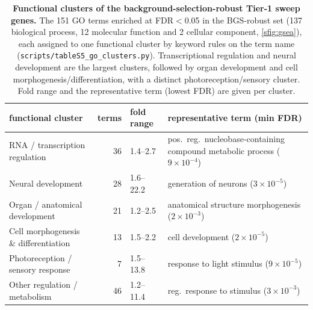 \documentclass[11pt]{article}
\begin{document}
\begin{table}[h]\centering
  \caption{\textbf{Functional clusters of the background-selection-robust Tier-1 sweep genes.} The 151 GO terms
    enriched at FDR$<$0.05 in the BGS-robust set (137 biological process, 12 molecular function and 2 cellular
    component, \cref{sfig:gsea}), each assigned to one functional cluster by keyword rules on the term name
    (\texttt{scripts/tableS5\_go\_clusters.py}). Transcriptional regulation and neural development are the
    largest clusters, followed by organ development and cell morphogenesis/differentiation, with a distinct
    photoreception/sensory cluster. Fold range and the representative term (lowest FDR) are given per cluster.}
  \label{stab:goclusters}
  \small
  \begin{tabular}{lrlp{62mm}}
    \toprule
    functional cluster & terms & fold range & representative term (min FDR) \\
    \midrule
    RNA / transcription regulation & 36 & 1.4--2.7 & pos.\ reg.\ nucleobase-containing compound metabolic process ($9\times10^{-4}$) \\
    Neural development & 28 & 1.6--22.2 & generation of neurons ($3\times10^{-5}$) \\
    Organ / anatomical development & 21 & 1.2--2.5 & anatomical structure morphogenesis ($2\times10^{-3}$) \\
    Cell morphogenesis \& differentiation & 13 & 1.5--2.2 & cell development ($2\times10^{-5}$) \\
    Photoreception / sensory response & 7 & 1.5--13.8 & response to light stimulus ($9\times10^{-5}$) \\
    Other regulation / metabolism & 46 & 1.2--11.4 & reg.\ response to stimulus ($3\times10^{-3}$) \\
    \bottomrule
  \end{tabular}
\end{table}
\end{document}
